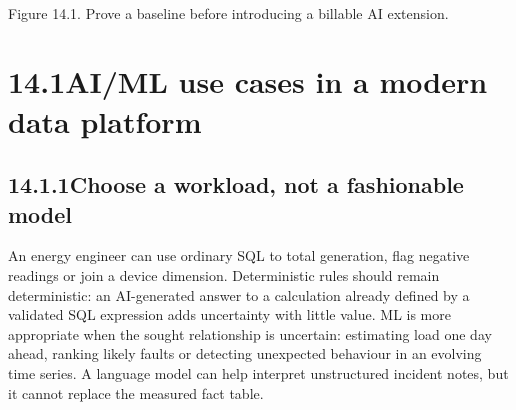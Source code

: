 \documentclass[11pt,twoside]{article}
\newcommand{\topic}[2]{\subsection*{#1\quad #2}}
\begin{document}
\begin{center}\\{\fontsize{8}{9}\selectfont\color{inkgray}Figure 14.1. Prove a baseline before introducing a billable AI extension.}\end{center}

\newpage

\section*{14.1\quad AI/ML use cases in a modern data platform}
\topic{14.1.1}{Choose a workload, not a fashionable model}
An energy engineer can use ordinary SQL to total generation, flag negative readings or join a device dimension. Deterministic rules should remain deterministic: an AI-generated answer to a calculation already defined by a validated SQL expression adds uncertainty with little value. ML is more appropriate when the sought relationship is uncertain: estimating load one day ahead, ranking likely faults or detecting unexpected behaviour in an evolving time series. A language model can help interpret unstructured incident notes, but it cannot replace the measured fact table.
\end{document}
